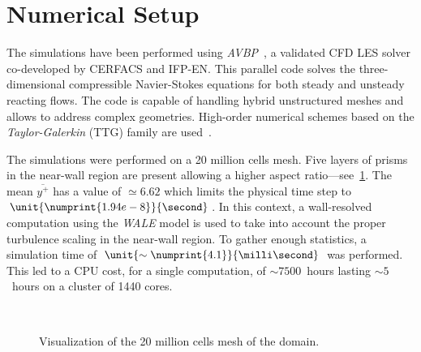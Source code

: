 \section{Numerical Setup}\label{sec:ls89_num}

The simulations have been performed using \textit{AVBP}~\cite{Gicquel2011}, a validated CFD LES solver co-developed by CERFACS and IFP-EN. This parallel code solves the three-dimensional compressible Navier-Stokes equations for both steady and unsteady reacting flows. The code is capable of handling hybrid unstructured meshes and allows to address complex geometries. High-order numerical schemes based on the \textit{Taylor-Galerkin} (TTG) family are used~\cite{Quartapelle1993}. 

The simulations were performed on a 20 million cells mesh. Five layers of prisms in the near-wall region are present allowing a higher aspect ratio---see~\cref{fig:ls89_mesh}. The mean $\overline{y^+}$ has a value of $\simeq 6.62$ which limits the physical time step to $\unit{\numprint{1.94e-8}}{\second}$. In this context, a wall-resolved computation using the \textit{WALE} \cite{Nicoud1999} model is used to take into account the proper turbulence scaling in the near-wall region. To gather enough statistics, a simulation time of $\unit{\sim\numprint{4.1}}{\milli\second}$ was performed. This led to a CPU cost, for a single computation, of $\sim7500$~hours lasting $\sim5$~hours on a cluster of 1440 cores.

\begin{figure}[!h]               
\centering
{}
 ~       
\caption{Visualization of the 20 million cells mesh of the domain.}
\label{fig:ls89_mesh}
\end{figure}

